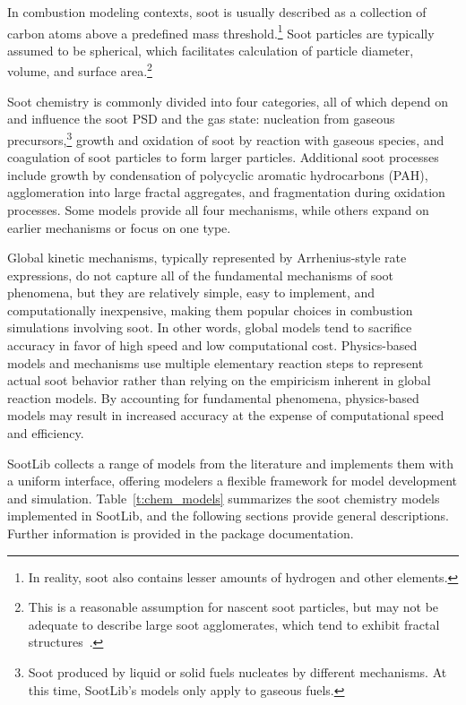 \documentclass[preprint,letterpaper]{elsarticle}
\begin{document}
In combustion modeling contexts, soot is usually described as a collection of carbon atoms above a predefined mass threshold.\footnote{In reality, soot also contains lesser amounts of hydrogen and other elements.} Soot particles are typically assumed to be spherical, which facilitates calculation of particle diameter, volume, and surface area.\footnote{This is a reasonable assumption for nascent soot particles, but may not be adequate to describe large soot agglomerates, which tend to exhibit fractal structures~\cite{Jullien_1987,Wang_2011}.}

Soot chemistry is commonly divided into four categories, all of which depend on and influence the soot PSD and the gas state: nucleation from gaseous precursors,\footnote{Soot produced by liquid or solid fuels nucleates by different mechanisms. At this time, SootLib's models only apply to gaseous fuels.} growth and oxidation of soot by reaction with gaseous species, and coagulation of soot particles to form larger particles.
Additional soot processes include growth by condensation of polycyclic aromatic hydrocarbons (PAH), agglomeration into large fractal aggregates, and fragmentation during oxidation processes.
Some models provide all four mechanisms, while others expand on earlier mechanisms or focus on one type.

Global kinetic mechanisms, typically represented by Arrhenius-style rate expressions, do not capture all of the fundamental mechanisms of soot phenomena, but they are relatively simple, easy to implement, and computationally inexpensive, making them popular choices in combustion simulations involving soot.
In other words, global models tend to sacrifice accuracy in favor of high speed and low computational cost.
Physics-based models and mechanisms use multiple elementary reaction steps to represent actual soot behavior rather than relying on the empiricism inherent in global reaction models.
By accounting for fundamental phenomena, physics-based models may result in increased accuracy at the expense of computational speed and efficiency.

SootLib collects a range of models from the literature and implements them with a uniform interface, offering modelers a flexible framework for model development and simulation. Table~\ref{t:chem_models} summarizes the soot chemistry models implemented in SootLib, and the following sections provide general descriptions. Further information is provided in the package documentation.
\end{document}
